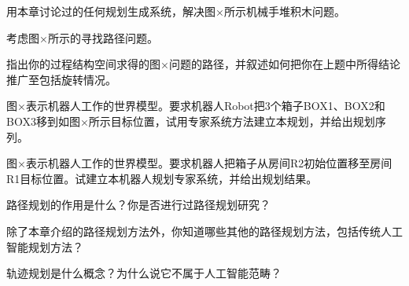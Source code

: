 \begin{question}
用本章讨论过的任何规划生成系统，解决图×所示机械手堆积木问题。
\end{question}
\begin{solution}
\end{solution}

\begin{question}
考虑图×所示的寻找路径问题。 
\end{question}
\begin{solution}
\end{solution}

\begin{question}
指出你的过程结构空间求得的图×问题的路径，并叙述如何把你在上题中所得结论推广至包括旋转情况。
\end{question}
\begin{solution}
\end{solution}

\begin{question}
图×表示机器人工作的世界模型。要求机器人Robot把3个箱子BOX1、BOX2和BOX3移到如图×所示目标位置，试用专家系统方法建立本规划，并给出规划序列。
\end{question}
\begin{solution}
\end{solution}

\begin{question}
图×表示机器人工作的世界模型。要求机器人把箱子从房间R2初始位置移至房间R1目标位置。试建立本机器人规划专家系统，并给出规划结果。
\end{question}
\begin{solution}
\end{solution}

\begin{question}
路径规划的作用是什么？你是否进行过路径规划研究？
\end{question}
\begin{solution}
\end{solution}

\begin{question}
除了本章介绍的路径规划方法外，你知道哪些其他的路径规划方法，包括传统人工智能规划方法？
\end{question}
\begin{solution}
\end{solution}

\begin{question}
轨迹规划是什么概念？为什么说它不属于人工智能范畴？
\end{question}
\begin{solution}
\end{solution}